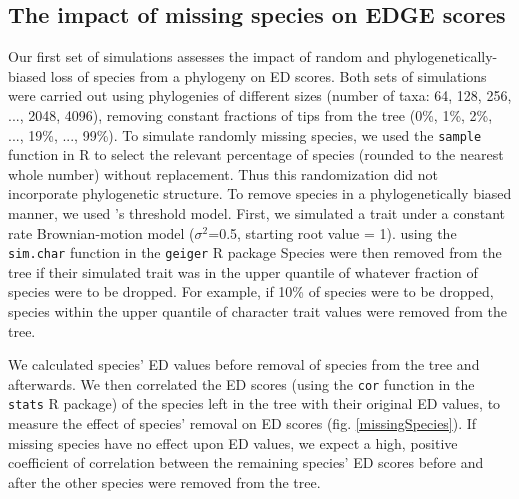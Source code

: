 \documentclass[12pt,english]{article}
\begin{document}
\subsection*{The impact of missing species on EDGE scores}
Our first set of simulations assesses the impact of random and
phylogenetically-biased loss of species from a phylogeny on ED scores. Both sets
of simulations were carried out using phylogenies of different sizes (number of
taxa: 64, 128, 256, ..., 2048, 4096), removing constant fractions of tips from
the tree (0\%, 1\%, 2\%, ..., 19\%, ..., 99\%). To simulate randomly missing
species, we used the \texttt{sample} function in R to select the relevant
percentage of species (rounded to the nearest whole number) without replacement.
Thus this randomization did not incorporate phylogenetic structure. To remove
species in a phylogenetically biased manner, we used
\textcite{Felsenstein2005}'s threshold model. First, we simulated a trait under
a constant rate Brownian-motion model ($\sigma^2$=0.5, starting root value = 1).
using the \texttt{sim.char} function in the \texttt{geiger} R package
\autocite{Pennell2014} Species were then removed from the tree if their
simulated trait was in the upper quantile of whatever fraction of species were
to be dropped. For example, if 10\% of species were to be dropped, species
within the upper  quantile of character trait values were removed from
the tree. 

We calculated species' ED values before removal of species from the tree and
afterwards. We then correlated the ED scores (using the \texttt{cor} function in
the \texttt{stats} R package) of the species left in the tree with their
original ED values, to measure the effect of species' removal on ED scores (fig.
\ref{missingSpecies}). If missing species have no effect upon ED values, we
expect a high, positive coefficient of correlation between the remaining
species' ED scores before and after the other species were removed from the
tree.
\end{document}
